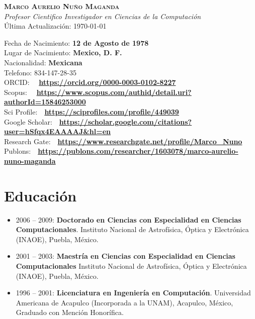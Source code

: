 \documentclass[letterpaper,10pt]{article}
\newcounter{num}
\begin{document}
\begin{center}
    \textbf{\Large \scshape Marco Aurelio Nuño Maganda} \\ \vspace{1pt}
    \textit{Profesor Cientifico Investigador en Ciencias de la Computación} \\
    Última Actualización: \today \\
\end{center}

\begin{minipage}{0.98 \textwidth} %
Fecha de Nacimiento: \textbf{12 de Agosto de 1978} \\
Lugar de Nacimiento: \textbf{Mexico, D. F.}\\
Nacionalidad: \textbf{Mexicana}\\
Telefono: 834-147-28-35  \\
ORCID: \ \ \textbf{\url{https://orcid.org/0000-0003-0102-8227}} \\
Scopus: \ \ \textbf{\url{https://www.scopus.com/authid/detail.uri?authorId=15846253000}} \\
Sci Profile:\ \ \textbf{\url{https://sciprofiles.com/profile/449039}} \\
Google Scholar:\ \ \textbf{\url{https://scholar.google.com/citations?user=hSfqx4EAAAAJ&hl=en}}\\
Research Gate:\ \ \textbf{\url{https://www.researchgate.net/profile/Marco_Nuno}}\\
Publons:\ \  \textbf{\url{https://publons.com/researcher/1603078/marco-aurelio-nuno-maganda}}\\
\end{minipage}


\section{Educación}
 \begin{itemize}[leftmargin=0.15in, label={}]
\item 2006 -- 2009: \textbf{Doctorado en Ciencias con Especialidad en Ciencias Computacionales}. 
    Instituto Nacional de Astrofísica, Óptica y Electrónica (INAOE), Puebla, México.
%
\item 2001 -- 2003: \textbf{Maestría en Ciencias con Especialidad en Ciencias Computacionales}
    Instituto Nacional de Astrofísica, Óptica y Electrónica (INAOE), Puebla, México. 

\item 1996 -- 2001: \textbf{Licenciatura en Ingeniería en Computación}.
	Universidad Americana de Acapulco (Incorporada a la UNAM), Acapulco, México, Graduado con Mención Honorífica. 
 \end{itemize}
\end{document}
